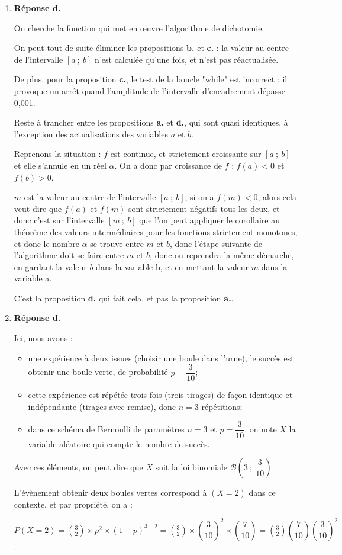 \begin{enumerate}
	\item \textbf{Réponse d.}

On cherche la fonction qui met en \oe{}uvre l'algorithme de dichotomie.

On peut tout de suite éliminer les propositions \textbf{b.} et \textbf{c.} : la valeur au centre de l'intervalle $ [a~;~b] $ n'est calculée qu'une fois, et n'est pas réactualisée.

De plus, pour la proposition \textbf{c.}, le test de la boucle "while" est incorrect : il provoque un arrêt quand l'amplitude de l'intervalle d'encadrement dépasse 0,001.

Reste à trancher entre les propositions \textbf{a.} et \textbf{d.}, qui sont quasi identiques, à l'exception des actualisations des variables $a$ et $b$.

Reprenons la situation : $f$ est continue, et strictement croissante sur $ [a~;~b] $ et elle s'annule en un réel $\alpha$. On a donc par croissance de $f$ : $f(a) < 0$ et $f(b) > 0$.

$m$ est la valeur au centre de l'intervalle $ [a~;~b] $, si on a $f(m) <0$, alors cela veut dire que $f(a)$ et $f(m)$ sont strictement négatifs tous les deux, et donc c'est sur l'intervalle $ [m~;~b] $ que l'on peut appliquer le corollaire au théorème des valeurs intermédiaires pour les fonctions strictement monotones, et donc le nombre $\alpha$ se trouve entre $m$ et $b$, donc l'étape suivante de l'algorithme doit se faire entre $m$ et $b$, donc on reprendra la même démarche, en gardant la valeur $b$ dans la variable b, et en mettant la valeur $m$ dans la variable a.

C'est la proposition \textbf{d.} qui fait cela, et pas la proposition \textbf{a.}.

	\item \textbf{Réponse d.}

Ici, nous avons :
\begin{itemize}
\item une expérience à deux issues (choisir une boule dans l'urne), le succès est \og obtenir une boule verte\fg{}, de probabilité $p = \dfrac{3}{10}$;
\item cette expérience est répétée trois fois (trois tirages) de façon identique et indépendante (tirages avec remise), donc $n=3$ répétitions;
\item dans ce schéma de Bernoulli de paramètres $n=3$ et $p=\dfrac{3}{10}$, on note $X$ la variable aléatoire qui compte le nombre de succès.
\end{itemize}

Avec ces éléments, on peut dire que $X$ suit la loi binomiale $ \mathcal{B}\left(3 ~;~ \dfrac{3}{10}\right)$.

L'évènement \og obtenir deux boules vertes\fg{} correspond à $(X = 2)$ dans ce contexte, et par propriété, on a :

	$\displaystyle P(X = 2) = \binom{3}{2}\times p^2\times \left(1 - p\right)^{3-2} = \binom{3}{2}\times \left(\dfrac{3}{10}\right)^2\times \left(\dfrac{7}{10}\right) = \binom{3}{2}\left(\dfrac{7}{10}\right) \left(\dfrac{3}{10}\right)^2$.
\end{enumerate}
\bigskip
